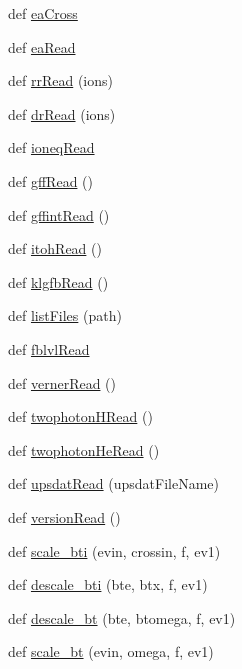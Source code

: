 \begin{DoxyCompactItemize}
\item 
def \hyperlink{namespacepyneb_1_1utils_1_1__chianti__tools_a5c2be70e50273734d319a433bf39ce5b}{ea\+Cross}
\item 
def \hyperlink{namespacepyneb_1_1utils_1_1__chianti__tools_ab4f78a2584a1ddf189af644e961f0f83}{ea\+Read}
\item 
def \hyperlink{namespacepyneb_1_1utils_1_1__chianti__tools_a71865c846f3d3b1c9b1371c6779c8f3e}{rr\+Read} (ions)
\item 
def \hyperlink{namespacepyneb_1_1utils_1_1__chianti__tools_aa29da4afe4adccd8de62c0dd97799dcd}{dr\+Read} (ions)
\item 
def \hyperlink{namespacepyneb_1_1utils_1_1__chianti__tools_a8b6257cfe133ac906966b20c8721f82a}{ioneq\+Read}
\item 
def \hyperlink{namespacepyneb_1_1utils_1_1__chianti__tools_af524b50fae5a347eff4976b7ce895ab1}{gff\+Read} ()
\item 
def \hyperlink{namespacepyneb_1_1utils_1_1__chianti__tools_a27deea720e4534912f04b54fe5c17b93}{gffint\+Read} ()
\item 
def \hyperlink{namespacepyneb_1_1utils_1_1__chianti__tools_a3dc5585b3508d8baf58ba62d0f728f16}{itoh\+Read} ()
\item 
def \hyperlink{namespacepyneb_1_1utils_1_1__chianti__tools_aa4cdc5fd04cf99d7600e480f0dc95ae4}{klgfb\+Read} ()
\item 
def \hyperlink{namespacepyneb_1_1utils_1_1__chianti__tools_a680536bf77d8f8baa8434c1bf84350a4}{list\+Files} (path)
\item 
def \hyperlink{namespacepyneb_1_1utils_1_1__chianti__tools_a63235035cef376c49a1f4e81933452a6}{fblvl\+Read}
\item 
def \hyperlink{namespacepyneb_1_1utils_1_1__chianti__tools_addacad8fe4cf3dff7f457b8b4a58054f}{verner\+Read} ()
\item 
def \hyperlink{namespacepyneb_1_1utils_1_1__chianti__tools_ae03bdc8f81142c34a58f9567f3359322}{twophoton\+H\+Read} ()
\item 
def \hyperlink{namespacepyneb_1_1utils_1_1__chianti__tools_a79401d478ca07c45f4546a82634e6eb9}{twophoton\+He\+Read} ()
\item 
def \hyperlink{namespacepyneb_1_1utils_1_1__chianti__tools_a4fab6d9973653d9ca82088006f2a12fe}{upsdat\+Read} (upsdat\+File\+Name)
\item 
def \hyperlink{namespacepyneb_1_1utils_1_1__chianti__tools_a349618b1b79ca902de8a030592d6d43a}{version\+Read} ()
\item 
def \hyperlink{namespacepyneb_1_1utils_1_1__chianti__tools_a71b9295157832135424ea7dc0138fcd4}{scale\+\_\+bti} (evin, crossin, f, ev1)
\item 
def \hyperlink{namespacepyneb_1_1utils_1_1__chianti__tools_a47075ba90f01cbd7a3dbd08115544214}{descale\+\_\+bti} (bte, btx, f, ev1)
\item 
def \hyperlink{namespacepyneb_1_1utils_1_1__chianti__tools_ad34ed06dfc613c2f1ace88fab4ac4392}{descale\+\_\+bt} (bte, btomega, f, ev1)
\item 
def \hyperlink{namespacepyneb_1_1utils_1_1__chianti__tools_abdf42d0f9176edb418859e7a12fa4bce}{scale\+\_\+bt} (evin, omega, f, ev1)
\end{DoxyCompactItemize}
